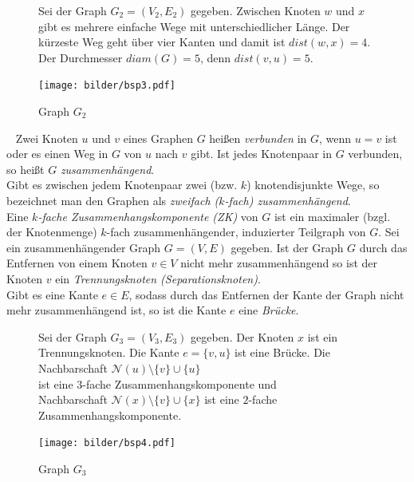 \begin{figure}[h!]
\begin{minipage}{230pt}
Sei der Graph $G_2=(V_2,E_2)$ gegeben. Zwischen Knoten $w$ und $x$ gibt es mehrere einfache Wege mit unterschiedlicher Länge. Der kürzeste Weg geht über vier Kanten und damit ist $dist(w, x)=4$. Der Durchmesser $diam(G)=5$, denn $dist(v, u)=5$.
\end{minipage}
\begin{minipage}{220pt}
		\centering 		 
   \texttt{[image: bilder/bsp3.pdf]}
	\caption{Graph $G_2$}
\end{minipage}
  	 \end{figure}
  	 \vspace{-2mm}
  	 ~\linebreak
Zwei Knoten $u$ und $v$ eines Graphen $G$ heißen \emph{verbunden} in $G$, wenn $u = v$ ist oder es einen Weg in $G$ von $u$ nach $v$ gibt. Ist jedes Knotenpaar in $G$ verbunden, so heißt $G$ \emph{zusammenhängend}.\\Gibt es zwischen jedem Knotenpaar zwei (bzw. $k$) knotendisjunkte Wege, so bezeichnet man den Graphen als \emph{zweifach ($k$-fach) zusammenhängend}.\\Eine \emph{$k$-fache Zusammenhangskomponente (ZK)} von $G$ ist ein maximaler (bzgl. der Knotenmenge) $k$-fach zusammenhängender, induzierter Teilgraph von $G$.\newline\newline
Sei ein zusammenhängender Graph $G=(V,E)$ gegeben. Ist der Graph $G$ durch das Entfernen von einem Knoten $v \in V$ nicht mehr zusammenhängend so ist der Knoten $v$ ein \emph{Trennungsknoten (Separationsknoten)}.\\Gibt es eine Kante $e \in E$, sodass durch das Entfernen der Kante der Graph nicht mehr zusammenhängend ist, so ist die Kante $e$ eine \emph{Brücke}.

\begin{figure}[h!]
\begin{minipage}{260pt}
Sei der Graph $G_3=(V_3,E_3)$ gegeben. Der Knoten $x$ ist ein Trennungsknoten. Die Kante $e=\{v,u\}$ ist eine Brücke. Die Nachbarschaft $\mathcal{N}(u)\setminus \{v\}\cup\{u\}$\\ist eine $3$-fache Zusammenhangskomponente und\\Nachbarschaft $\mathcal{N}(x)\setminus \{v\}\cup\{x\}$ ist eine $2$-fache Zusammenhangskomponente.
\end{minipage}
\begin{minipage}{160pt}
		\centering 		 
   \texttt{[image: bilder/bsp4.pdf]}
	\caption{Graph $G_3$}
\end{minipage}
  	 \end{figure}
  	\newpage
